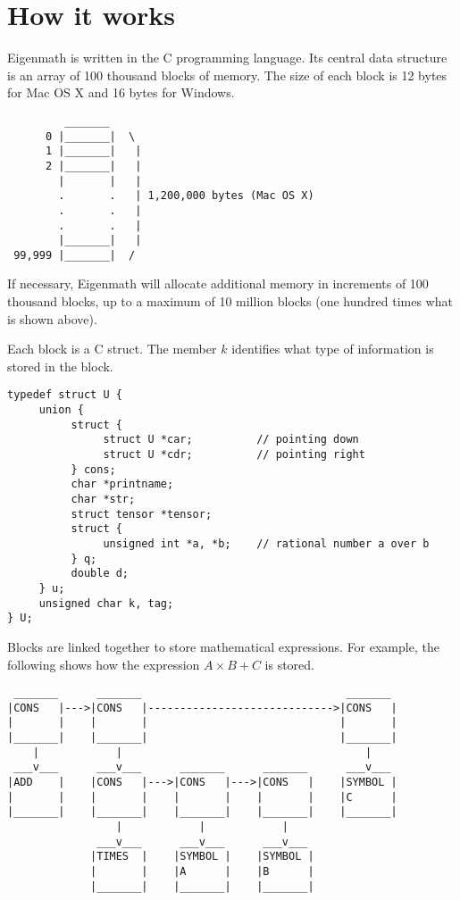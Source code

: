 \chapter{How it works}

Eigenmath is written in the C programming language.
Its central data structure is
an array of 100 thousand blocks of memory.
The size of each block is 12 bytes for Mac OS X
and 16 bytes for Windows.
\begin{verbatim}
         _______ 
      0 |_______|  \
      1 |_______|   |
      2 |_______|   |
        |       |   |
        .       .   | 1,200,000 bytes (Mac OS X)
        .       .   |
        .       .   |
        |_______|   |
 99,999 |_______|  /
\end{verbatim}

\bigskip
\noindent
If necessary, Eigenmath will allocate additional memory in increments of
100 thousand blocks, up to a maximum of 10 million blocks
(one hundred times what is shown above).


\newpage

\noindent
Each block is a C struct.
The member $k$ identifies what type of information is stored in the
block.

\medskip
\begin{verbatim}
typedef struct U {
     union {
          struct {
               struct U *car;          // pointing down
               struct U *cdr;          // pointing right
          } cons;
          char *printname;
          char *str;
          struct tensor *tensor;
          struct {
               unsigned int *a, *b;    // rational number a over b
          } q;
          double d;
     } u;
     unsigned char k, tag;
} U;
\end{verbatim}

\newpage

\noindent
Blocks are linked together to store mathematical expressions.
For example, the following shows how the expression
$A\times B+C$ is stored.

\begin{verbatim}
 _______      _______                                _______
|CONS   |--->|CONS   |----------------------------->|CONS   |
|       |    |       |                              |       |
|_______|    |_______|                              |_______|
    |            |                                      |
 ___v___      ___v___      _______      _______      ___v___
|ADD    |    |CONS   |--->|CONS   |--->|CONS   |    |SYMBOL |
|       |    |       |    |       |    |       |    |C      |
|_______|    |_______|    |_______|    |_______|    |_______|
                 |            |            |
              ___v___      ___v___      ___v___
             |TIMES  |    |SYMBOL |    |SYMBOL |
             |       |    |A      |    |B      |
             |_______|    |_______|    |_______|
\end{verbatim}

